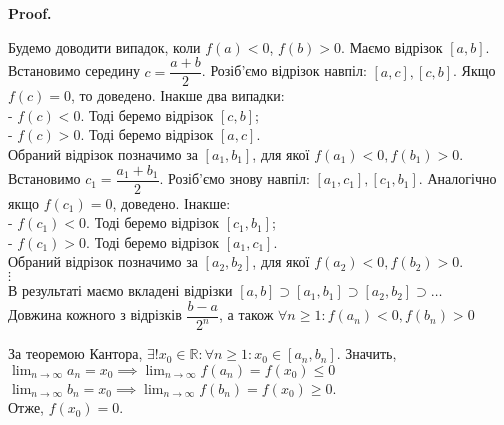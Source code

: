 \documentclass[a4paper, 14pt]{article}
\makeatletter
\def\qed{$\blacksquare$}
\theoremstyle{theoremdd}
\theoremstyle{theoremdd}
\theoremstyle{theoremdd}
\theoremstyle{theoremdd}
\theoremstyle{theoremdd}
\theoremstyle{theoremdd}
\theoremstyle{theoremdd}
\theoremstyle{theoremdd}
\renewenvironment{proof}[1][Proof.\\]{\par
\pushQED{\hfill \qed}%
\normalfont \topsep6\p@\@plus6\p@\relax
\trivlist
\item\relax
{\bfseries
#1\@addpunct{.}}\hspace\labelsep\ignorespaces
}{%
\popQED\endtrivlist\@endpefalse
}
\makeatother
\begin{document}
\begin{proof}
Будемо доводити випадок, коли $f(a) < 0$, $f(b) > 0$. Маємо відрізок $[a,b]$. \\ 
Встановимо середину $c = \dfrac{a+b}{2}$. Розіб'ємо відрізок навпіл: $[a, c], [c, b]$. Якщо $f(c) = 0$, то доведено. Інакше два випадки:\\
- $f(c) < 0$. Тоді беремо відрізок $[c,b]$;\\
- $f(c) > 0$. Тоді беремо відрізок $[a,c]$.\\
Обраний відрізок позначимо за $[a_1,b_1]$, для якої $f(a_1) < 0, f(b_1) > 0$.\\
Встановимо $c_1 = \dfrac{a_1+b_1}{2}$. Розіб'ємо знову навпіл: $[a_1,c_1],[c_1,b_1]$. Аналогічно якщо $f(c_1) = 0$, доведено. Інакше:\\
- $f(c_1) < 0$. Тоді беремо відрізок $[c_1,b_1]$;\\
- $f(c_1) > 0$. Тоді беремо відрізок $[a_1,c_1]$.\\
Обраний відрізок позначимо за $[a_2,b_2]$, для якої $f(a_2) < 0, f(b_2) > 0$.\\
$\vdots$\\
В результаті маємо вкладені відрізки $[a,b] \supset [a_1,b_1] \supset [a_2,b_2] \supset \dots$ \\
Довжина кожного з відрізків $\dfrac{b-a}{2^n}$, а також $\forall n \geq 1: f(a_n) < 0, f(b_n) > 0$\\
\begin{figure}[H]
\centering
{}
\end{figure}
За теоремою Кантора, $\exists! x_0 \in \mathbb{R}: \forall n \geq 1: x_0 \in [a_n,b_n]$. Значить,\\
$\displaystyle\lim_{n \to \infty} a_n = x_0 \implies \displaystyle\lim_{n \to \infty} f(a_n) = f(x_0) \leq 0$\\
$\displaystyle\lim_{n \to \infty} b_n = x_0 \implies \displaystyle\lim_{n \to \infty} f(b_n) = f(x_0) \geq 0$.\\
Отже, $f(x_0) = 0$.
\end{proof}
\end{document}
